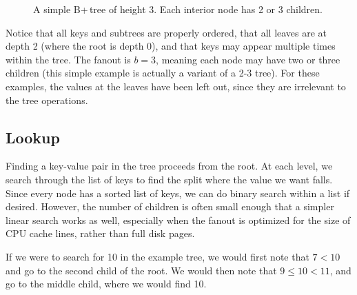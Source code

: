 \documentclass[a4paper,12pt]{article}
\begin{document}
\begin{figure}[h]
    \centering
    \caption{A simple B+\,tree of height 3. Each interior node has 2 or 3 children.}
    \label{fig:demotree1}
\end{figure}

Notice that all keys and subtrees are properly ordered, that all leaves are at depth 2 (where the root is depth 0), and that keys may appear multiple times within the tree. The fanout is $b=3$, meaning each node may have two or three children (this simple example is actually a variant of a 2-3 tree). For these examples, the values at the leaves have been left out, since they are irrelevant to the tree operations.

\subsection{Lookup}

Finding a key-value pair in the tree proceeds from the root. At each level, we search through the list of keys to find the split where the value we want falls. Since every node has a sorted list of keys, we can do binary search within a list if desired. However, the number of children is often small enough that a simpler linear search works as well, especially when the fanout is optimized for the size of CPU cache lines, rather than full disk pages.

If we were to search for 10 in the example tree, we would first note that $7 < 10$ and go to the second child of the root. We would then note that $9 \leq 10 < 11$, and go to the middle child, where we would find 10.
\end{document}
